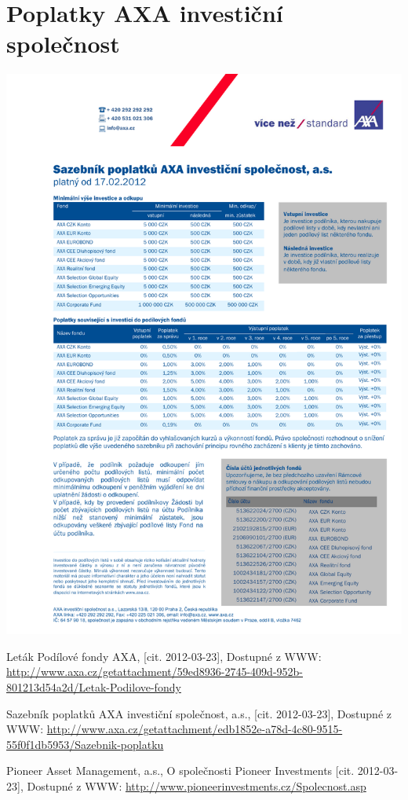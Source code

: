 \documentclass[a4paper,12pt]{article}
\begin{document}
\section{Poplatky AXA investiční společnost \cite{axa_cite}}
\label{axa}	
\includegraphics[width=1.0\textwidth]{axa.pdf}
\renewcommand{\bibname}{Seznam použité literatury}
\begin{thebibliography}{9}
\thispagestyle{plain}

Leták Podílové fondy AXA, [cit. 2012-03-23], Dostupné z WWW:  \url{http://www.axa.cz/getattachment/59ed8936-2745-409d-952b-801213d54a2d/Letak-Podilove-fondy}


Sazebník poplatků AXA investiční společnost, a.s., [cit. 2012-03-23], Dostupné z WWW:  \url{http://www.axa.cz/getattachment/edb1852e-a78d-4c80-9515-55f0f1db5953/Sazebnik-poplatku}

Pioneer Asset Management, a.s., O společnosti Pioneer Investments [cit. 2012-03-23], Dostupné z WWW:  \url{http://www.pioneerinvestments.cz/Spolecnost.asp}
\end{thebibliography}
\end{document}

